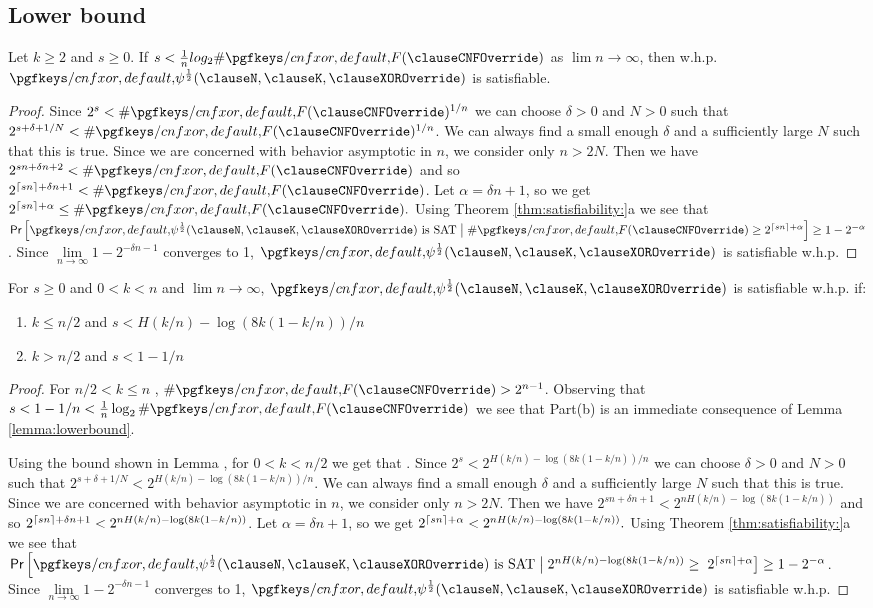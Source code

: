 \subsection{Lower bound}
\begin{lemma}
	\label{lemma:lowerbound}	
	Let $k \geq 2$ and $ s\geq 0.$ If $s < \frac{1}{n} {log_{2} \#\F }$ as $\lim\limits{n \to \infty}$, then w.h.p. $ \FQ$ is satisfiable.
\end{lemma}
\begin{proof}	Since $2^{s}  < \#\F^{1/n}$ we can choose $\delta > 0$ and $ N > 0$ such that $ 2^{s + \delta + 1/N} < \#\F^{1/n}$. We can always find a small enough $\delta$ and a sufficiently large $N$ such that this is true. Since we are concerned with behavior asymptotic in $n$, we consider only $n>2N$. Then we have $2^{sn + \delta n + 2} < \#\F$ and so $2^{\ceil{sn} + \delta n + 1} < \#\F$. Let $\alpha = \delta n + 1$, so we get $2^{\ceil{sn}+\alpha} \leq  \#\F.$  Using Theorem \ref{thm:satisfiability:}a we see that $\P{\FQ\text{ is SAT} \bigm\vert \#\F\geq2^{\ceil{sn} + \alpha} } \geq 1- 2^{-\alpha}$. Since $\lim \limits_{n \to \infty} 1-2^{-\delta n - 1}$ converges to 1, $\FQ$ is satisfiable w.h.p.
\end{proof}


\begin{lemma}
	\label{lemma:lowerbound:approx}
	For $s \geq 0 $ and $ 0 < k < n$ and $\lim\limits{n \to \infty}$, $\FQ$ is satisfiable w.h.p. if:
	\begin{enumerate}
	\item $k\leq n/2 $ and $ s <  H(k/n) - \log(8k(1-k/n))/n $
	\item $k> n/2$ and $ s<1-1/n $
	\end{enumerate}
\end{lemma}
\begin{proof}
  For $n/2 < k \leq n$ , $\#\F > 2^{n-1}$. Observing that $s<1-1/n<\frac{1}{n} \log_{2}\#\F$ we see that Part(b) is an immediate consequence of Lemma \ref{lemma:lowerbound}.	
 
	Using the bound shown in Lemma , for $0< k<n/2$ we get that		
. Since $2^{s}  < 2^{H(k/n) - \log(8k(1-k/n))/n}$ we can choose $\delta > 0$ 	and $ N > 0$ such that $ 2^{s + \delta + 1/N} < 2^{H(k/n) - \log(8k(1-k/n))/n}$. We can always find a small enough $\delta$ and a sufficiently large $N$ such that this is true. Since we are concerned with behavior asymptotic in $n$, we consider only $n>2N$. Then we have $2^{sn + \delta n + 1} < 2^{nH(k/n) - \log(8k(1-k/n))}$ and so $2^{\left\lceil sn\right\rceil + \delta n + 1} < 2^{nH(k/n) - \log(8k(1-k/n))}$. Let $\alpha = \delta n + 1$, so we get $2^{\left\lceil sn\right\rceil+\alpha} < 2^{nH(k/n) - \log(8k(1-k/n))}.$  Using Theorem \ref{thm:satisfiability:}a we see that $\P{\FQ\text{ is SAT} \bigm\vert 2^{nH(k/n) - \log(8k(1-k/n))}\geq \right.$ $\left.2^{\ceil{sn} + \alpha} } \geq 1- 2^{-\alpha}$. Since $\lim \limits_{n \to \infty} 1-2^{-\delta n - 1}$ converges to 1, $\FQ$ is satisfiable w.h.p.
\end{proof}



